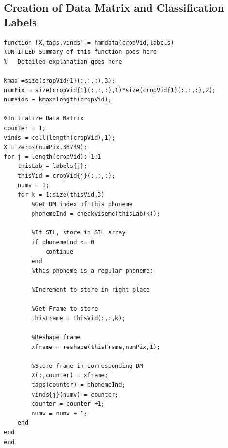 \documentclass[a4paper,11pt]{article}
\begin{document}
\subsection{Creation of Data Matrix and Classification Labels}
\begin{lstlisting}[style=myMatlabstyle]
function [X,tags,vinds] = hmmdata(cropVid,labels)
%UNTITLED Summary of this function goes here
%   Detailed explanation goes here

kmax =size(cropVid{1}(:,:,:),3);
numPix = size(cropVid{1}(:,:,:),1)*size(cropVid{1}(:,:,:),2);
numVids = kmax*length(cropVid);

%Initialize Data Matrix
counter = 1;
vinds = cell(length(cropVid),1);
X = zeros(numPix,36749);
for j = length(cropVid):-1:1
    thisLab = labels{j};
    thisVid = cropVid{j}(:,:,:);
    numv = 1;
    for k = 1:size(thisVid,3)
        %Get DM index of this phoneme
        phonemeInd = checkviseme(thisLab(k));
        
        %If SIL, store in SIL array
        if phonemeInd <= 0
            continue
        end
        %this phoneme is a regular phoneme:
        
        %Increment to store in right place
        
        %Get Frame to store
        thisFrame = thisVid(:,:,k);
        
        %Reshape frame
        xframe = reshape(thisFrame,numPix,1);
        
        %Store frame in corresponding DM
        X(:,counter) = xframe;
        tags(counter) = phonemeInd;
        vinds{j}(numv) = counter;
        counter = counter +1;
        numv = numv + 1;
    end
end
end
\end{lstlisting}
\end{document}
